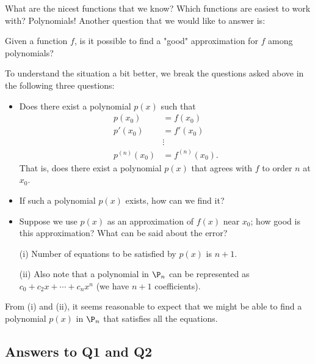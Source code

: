 What are the nicest functions that we know? Which functions are easiest to work with? Polynomials! Another question that we would like to answer is:
\begin{center}
    Given a function \( f \), is it possible to find a "good" approximation for \( f  \) among polynomials?
\end{center}

To understand the situation a bit better, we break the questions asked above in the following three questions:
\begin{itemize}
    \item Does there exist a polynomial \( p(x) \) such that 
        \begin{align*}
            p({x}_{0}) &= f({x}_{0}) \\
            p'({x}_{0}) &= f'({x}_{0}) \\
                        &\vdots \\
            p^{(n)}({x}_{0}) &= f^{(n)}({x}_{0}).
        \end{align*}
        That is, does there exist a polynomial \( p(x) \) that agrees with \( f  \) to order \( n  \) at \( {x}_{0} \).
    \item If such a polynomial \( p(x) \) exists, how can we find it? 
    \item Suppose we use \( p(x) \) as an approximation of \( f(x) \) near \( {x}_{0}  \); how good is this approximation? What can be said about the error?  
\end{itemize}

\begin{remark}
    \begin{enumerate}
        \item[(i)] Number of equations to be satisfied by \( p(x) \) is \( n + 1  \).
        \item[(ii)] Also note that a polynomial in \( {\P}_{n} \) can be represented as \( {c}_{0} + {c}_{2} x + \cdots + {c}_{n} x^{n} \) (we have \( n + 1  \) coefficients).  
    \end{enumerate}
    From (i) and (ii), it seems reasonable to expect that we might be able to find a polynomial \( p(x) \) in \( {\P}_{n} \) that satisfies all the equations. 
\end{remark}

\subsection{Answers to Q1 and Q2}

